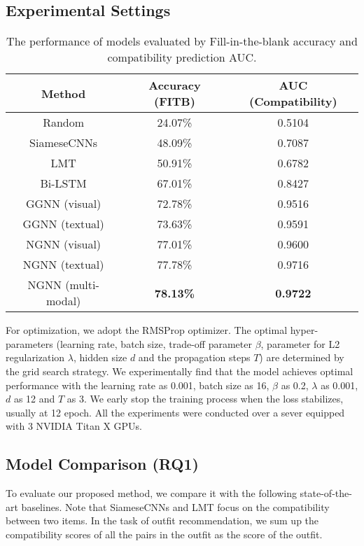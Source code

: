 \documentclass[sigconf]{acmart}
\begin{document}
\subsection{Experimental Settings}





\begin{table}[htbp]
  \centering
  \caption{The performance of models evaluated by Fill-in-the-blank accuracy and compatibility prediction AUC.}
    \begin{tabular}{ccc}
    \toprule
    Method & Accuracy (FITB)   &  AUC (Compatibility) \\
    \midrule
    Random &  24.07\%& 0.5104  \\
SiameseCNNs & 48.09\%   & 0.7087 \\
    LMT   &  50.91\%  & 0.6782\\
    Bi-LSTM & 67.01\%  & 0.8427  \\
GGNN (visual)& 72.78\%  &  0.9516 \\
    GGNN (textual)& 73.63\%  &  0.9591 \\
    \midrule
    NGNN (visual) & 77.01\%  & 0.9600 \\
    NGNN (textual) & 77.78\%  &  0.9716 \\
    NGNN (multi-modal)& \textbf{78.13\%}  & \textbf{0.9722} \\
    \bottomrule
    \end{tabular}\label{tab:compared_method}\end{table}

For optimization, we adopt the RMSProp optimizer. The optimal hyper-parameters (learning rate, batch size, trade-off parameter $\beta$, parameter for L2 regularization $\lambda$, hidden size $d$ and the propagation steps $T$) are determined by the grid search strategy. We experimentally find that the model achieves optimal performance with the learning rate as 0.001, batch size as 16, $\beta$ as 0.2, $\lambda$ as 0.001, $d$ as 12 and $T$ as 3.
We early stop the training process when the loss stabilizes, usually at 12 epoch. All the experiments were conducted over a sever equipped with 3 NVIDIA Titan X GPUs.


\subsection{Model Comparison (RQ1)}


To evaluate our proposed method, we compare it with the following state-of-the-art baselines. Note that SiameseCNNs and LMT focus on the compatibility between two items. In the task of outfit recommendation, we sum up the compatibility scores of all the pairs in the outfit as the score of the outfit.
\end{document}
